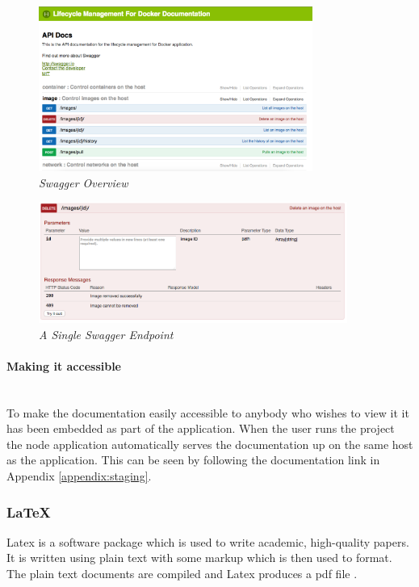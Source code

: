\begin{figure}[!ht]
\centering
\includegraphics*[width=0.8\textwidth]{images/swagger-overview}
\caption{\em Swagger Overview}
\label{fig:swagger-overview}
\end{figure}

\begin{figure}[!ht]
\centering
\includegraphics*[width=0.9\textwidth]{images/swagger-individual}
\caption{\em A Single Swagger Endpoint}
\label{fig:swagger-individual}
\end{figure}

\paragraph{Making it accessible}\mbox{}\\
To make the documentation easily accessible to anybody who wishes to view it it has been embedded as part of the application. When the user runs the project the node application automatically serves the documentation up on the same host as the application. This can be seen by following the documentation link in Appendix \ref{appendix:staging}.

\subsubsection{LaTeX}
Latex is a software package which is used to write academic, high-quality papers. It is written using plain text with some markup which is then used to format. The plain text documents are compiled and Latex produces a pdf file \citep{Latex2017}.

